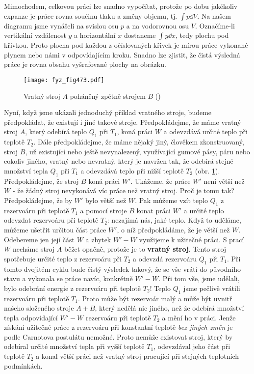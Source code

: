     Mimochodem, celkovou práci lze snadno vypočítat, protože po dobu jakékoliv expanze je práce
    rovna součinu tlaku a změny objemu, tj. \(\int p\dd{V}\). Na našem diagramu jsme vynášeli na
    svislou osu \(p\) a na vodorovnou osu \(V\). Označíme-li vertikální vzdálenost \(y\) a
    horizontální \(x\) dostaneme \(\int y\dd{x}\), tedy plochu pod křivkou. Proto plocha pod každou
    z očíslovaných křivek je mírou práce vykonané plynem nebo námi v odpovídajícím kroku. Snadno lze
    zjistit, že čistá výsledná práce je rovna obsahu vyšrafované plochy na obrázku.

    \begin{figure}[ht!] %
      \centering
      \texttt{[image: fyz\_fig473.pdf]}
      \caption{Vratný stroj \(A\) poháněný zpětně strojem \(B\) (\cite[s.~707]{Feynman01})}
      \label{fyz:fig473}
    \end{figure}

    Nyní, když jsme ukázali jednoduchý příklad vratného stroje, budeme předpokládat, že existují i
    jiné takové stroje. Předpokládejme, že máme vratný stroj \(A\), který odebírá teplo \(Q_1\) při
    \(T_1\), koná práci \(W\) a odevzdává určité teplo při teplotě \(T_2\). Dále předpokládejme, že
    máme nějaký jiný, člověkem zkonstruovaný, stroj \(B\), už existující nebo ještě nevynalezený,
    využívající gumové pásy, páru nebo cokoliv jiného, vratný nebo nevratný, který je navržen tak,
    že odebírá stejné množství tepla \(Q_1\) při \(T_1\) a odevzdává teplo při nižší teplotě \(T_2\)
    (obr. \ref{fyz:fig473}). Předpokládejme, že stroj \(B\) koná práci \(W'\). Ukážeme, že práce \(W
    '\) není větší než \(W\) - že žádný stroj nevykonává víc práce než vratný stroj. Proč je tomu
    tak? Předpokládejme, že by \(W'\) bylo větší než \(W\). Pak můžeme vzít teplo \(Q_1\) z
    rezervoáru při teplotě \(T_1\) a pomocí stroje \(B\) konat práci \(W'\) a určité teplo odevzdat
    rezervoáru při teplotě \(T_2\): nezajímá nás, jaké teplo. Když to uděláme, můžeme ušetřit
    určitou část práce \(W'\), o níž předpokládáme, že je větší než \(W\). Odebereme jen její část
    \(W\) a zbytek \(W'-W\) využijeme k užitečné práci. S prací \(W\) necháme stroj \(A\) běžet
    opačně, protože je to \textbf{vratný stroj}. Tento stroj spotřebuje určité teplo z rezervoáru
    při \(T_2\) a odevzdá rezervoáru \(Q_1\) při \(T_1\). Při tomto dvojitém cyklu bude čistý
    výsledek takový, že se vše vrátí do původního stavu a vykonala se práce navíc, konkrétně \(W
    '-W\). Při tom vše, jsme udělali, bylo odebrání energie z rezervoáru při teplotě \(T_2\)! Teplo
    \(Q_1\) jsme pečlivě vrátili rezervoáru při teplotě \(T_1\). Proto může být rezervoár malý a
    může být uvnitř našeho složeného stroje \(A + B\), který nedělá nic jiného, než že odebírá
    množství tepla odpovídající \(W'-W\) rezervoáru při teplotě \(T_2\) a mění ho v práci. Jenže
    získání užitečné práce z rezervoáru při konstantní teplotě \emph{bez jiných změn} je podle
    Carnotova postulátu nemožné. Proto nemůže existovat stroj, který by odebíral určité množství
    tepla při vyšší teplotě \(T_1\), odevzdával jeho část při teplotě \(T_2\) a konal větší práci
    než vratný stroj pracující při stejných teplotních podmínkách.

